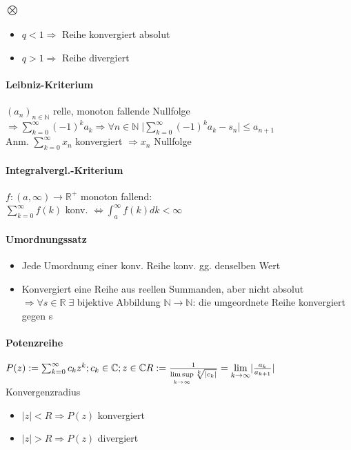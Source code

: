 \documentclass[paper=a3,paper=landscape, fontsize=9pt, DIV=30]{scrartcl}
\newcommand{\rplus}{{\mathbb{R}}^+}
\newcommand{\real}{{\mathbb{R}}}
\newcommand{\compl}{\mathbb{C}}
\newcommand{\nat}{\mathbb{N}}
\newcommand{\aseq}{(a_n)_{n \in \nat}}
\begin{document}
\begin{multicols*}{4}
  \paragraph{$\bigotimes$}
  \begin{itemize}
  \item $q < 1 \Rightarrow$ Reihe konvergiert absolut
  \item $q > 1 \Rightarrow$ Reihe divergiert
  \end{itemize}

  \paragraph{Leibniz-Kriterium}
  $\aseq$ relle, monoton fallende Nullfolge $ \Rightarrow \sum_{k=0}^{\infty} (-1)^ka_k \Rightarrow \forall n \in \nat \; \lvert \sum_{k=0}^{\infty}(-1)^ka_k-s_n \rvert \leq  a_{n+1}$\\
  Anm. $\sum_{k=0}^{\infty} x_n$ konvergiert $\Rightarrow x_n$ Nullfolge

  \paragraph{Integralvergl.-Kriterium}
  $f : (a, \infty) \rightarrow \rplus$ monoton fallend:\\$\sum_{k=0}^{\infty} f(k)$ konv. $\Leftrightarrow \int_{a}^{\infty} f(k) dk < \infty$
  
  \paragraph{Umordnungssatz}\begin{itemize}
  \item Jede Umordnung einer konv. Reihe konv. gg. denselben Wert
  \item Konvergiert eine Reihe aus reellen Summanden, aber nicht absolut $\Rightarrow \forall s \in \real \; \exists$ bijektive Abbildung $\nat \rightarrow \nat$: die umgeordnete Reihe konvergiert gegen s
\end{itemize}

  \paragraph{Potenzreihe}
    $ P(z) := \sum_{k=0}^{\infty} c_kz^k; c_k \in \compl; z \in \compl\\R := \frac{1}{\limsup\limits_{k \rightarrow \infty} \sqrt[k]{|c_k|}} = \lim\limits_{k \rightarrow \infty} \lvert \frac{a_k}{a_{k+1}} \rvert$ Konvergenzradius
    \begin{itemize}
    	\item $\lvert z \rvert < R \Rightarrow P(z)$ konvergiert
    	\item $\lvert z \rvert > R \Rightarrow P(z)$ divergiert
    \end{itemize}



\end{multicols*}
\end{document}
